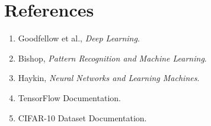 \documentclass[11pt]{article}
\begin{document}
\section{References}

\begin{enumerate}
    \item Goodfellow et al., \textit{Deep Learning}.
    \item Bishop, \textit{Pattern Recognition and Machine Learning}.
    \item Haykin, \textit{Neural Networks and Learning Machines}.
    \item TensorFlow Documentation.
    \item CIFAR-10 Dataset Documentation.
\end{enumerate}
\end{document}
